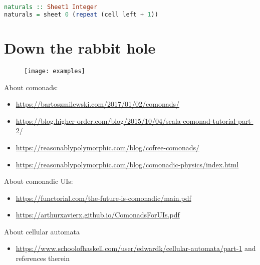 \documentclass[10pt]{beamer}
\begin{document}
\begin{frame}[fragile]
\begin{lstlisting}[language=haskell, basicstyle=\ttfamily]
naturals :: Sheet1 Integer
naturals = sheet 0 (repeat (cell left + 1))
\end{lstlisting}
\end{frame}

\section{Down the rabbit hole}

\begin{frame}[fragile]
\begin{figure}
    \centering
    \texttt{[image: examples]}
  \end{figure}
\end{frame}


\begin{frame}[fragile]
  About comonads:
  \begin{itemize}
    \item \url{https://bartoszmilewski.com/2017/01/02/comonads/}
    \item \url{https://blog.higher-order.com/blog/2015/10/04/scala-comonad-tutorial-part-2/}
    \item \url{https://reasonablypolymorphic.com/blog/cofree-comonads/}
    \item \url{https://reasonablypolymorphic.com/blog/comonadic-physics/index.html}
  \end{itemize}
\end{frame}
\begin{frame}[fragile]
  About comonadic UIs:
  \begin{itemize}
    \item \url{https://functorial.com/the-future-is-comonadic/main.pdf}
    \item \url{https://arthurxavierx.github.io/ComonadsForUIs.pdf}
  \end{itemize}
  About cellular automata
  \begin{itemize}
    \item \url{https://www.schoolofhaskell.com/user/edwardk/cellular-automata/part-1} and references therein
  \end{itemize}
\end{frame}
\end{document}
